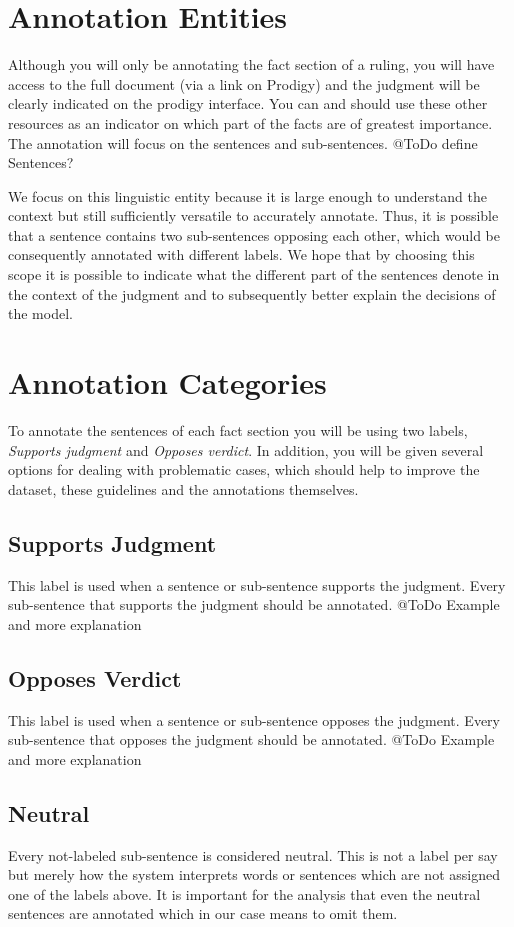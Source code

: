 \documentclass{article}
\begin{document}
\section{Annotation Entities}
Although you will only be annotating the fact section of a ruling, you will have access to the full document (via a link on Prodigy) and the judgment will be clearly indicated on the prodigy interface. You can and should use these other resources as an indicator on which part of the facts are of greatest importance.
The annotation will focus on the sentences and sub-sentences. 
@ToDo define Sentences?

We focus on this linguistic entity because it is large enough to understand the context but still sufficiently versatile to accurately annotate. Thus, it is possible that a sentence contains two sub-sentences opposing each other, which would be consequently annotated with different labels. We hope that by choosing this scope it is possible to indicate what the different part of the sentences denote in the context of the judgment and to subsequently better explain the decisions of the model.

\section{Annotation Categories}
To annotate the sentences of each fact section you will be using two labels,  \emph{Supports judgment} and \emph{Opposes verdict}. In addition, you will be given several options for dealing with problematic cases, which should help to improve the dataset, these guidelines and the annotations themselves.

\subsection{Supports Judgment}
This label is used when a sentence or sub-sentence supports the judgment. Every sub-sentence that supports the judgment should be annotated.
@ToDo Example and more explanation

\subsection{Opposes Verdict}
This label is used when a sentence or sub-sentence opposes the judgment. Every sub-sentence that opposes the judgment should be annotated.
@ToDo Example and more explanation

\subsection{Neutral}
Every not-labeled sub-sentence is considered neutral. This is not a label per say but merely how the system interprets words or sentences which are not assigned one of the labels above. It is important for the analysis that even the neutral sentences are annotated which in our case means to omit them.
\end{document}
